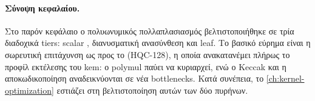 \enlargethispage{\baselineskip}   %
\paragraph{Σύνοψη κεφαλαίου.}
Στο παρόν κεφάλαιο ο πολυωνυμικός πολλαπλασιασμός βελτιστοποιήθηκε σε τρία
διαδοχικά tiers: scalar \clmul{}, διανυσματική ανασύνθεση και \vclmul{} leaf. Το βασικό εύρημα
είναι η σωρευτική επιτάχυνση  ως προς το 
(HQC-128), η οποία ανακατανέμει πλήρως το προφίλ εκτέλεσης του \gls{kem}: ο
polymul παύει να κυριαρχεί, ενώ ο Keccak και η αποκωδικοποίηση αναδεικνύονται
σε νέα bottlenecks. Κατά συνέπεια, το \cref{ch:kernel-optimization}
εστιάζει στη βελτιστοποίηση αυτών των δύο πυρήνων.
